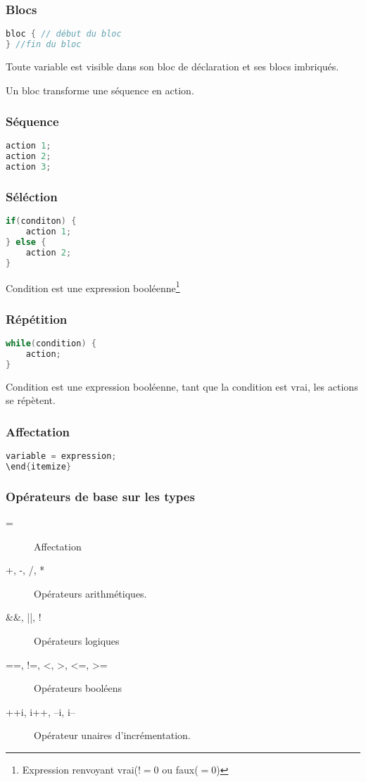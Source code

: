\documentclass[12pt,a4paper,openany]{article}
\begin{document}
	\subsubsection{Blocs}
\begin{lstlisting}[language=C, caption=Syntaxe d'un bloc]
bloc { // début du bloc
} //fin du bloc
\end{lstlisting}
	Toute variable est visible dans son bloc de déclaration et ses blocs imbriqués.

	Un bloc transforme une séquence en action.

	\subsubsection{Séquence}
\begin{lstlisting}[language=C, caption=Syntaxe des actions]
action 1;
action 2;
action 3;
\end{lstlisting}
	\subsubsection{Séléction}
\begin{lstlisting}[language=C, caption=Syntaxe d'une structure de contrôle]
if(conditon) {
	action 1;
} else {
	action 2;
}
\end{lstlisting}
Condition est une expression booléenne\footnote{Expression renvoyant vrai($!= 0$ ou faux($=0$)} %

\subsubsection{Répétition}
\begin{lstlisting}[language=C, caption=Syntaxe de répétition]
while(condition) {
	action;
}
\end{lstlisting}
Condition est une expression booléenne, tant que la condition est vrai, les actions se répètent.

\subsubsection{Affectation}
\begin{lstlisting}[language=C, caption=Syntaxe d'une affectation ]
variable = expression;
\end{itemize}
\end{lstlisting}
\subsubsection{Opérateurs de base sur les types}
\begin{description}
	\item[=] Affectation
	\item[+, -, /, *] Opérateurs arithmétiques.
	\item[\&\&, ||, !] Opérateurs logiques 
	\item[==, !=, <, >, <=, >=] Opérateurs booléens
	\item[++i, i++, --i, i--] Opérateur unaires d'incrémentation.
\end{description}
\end{document}

